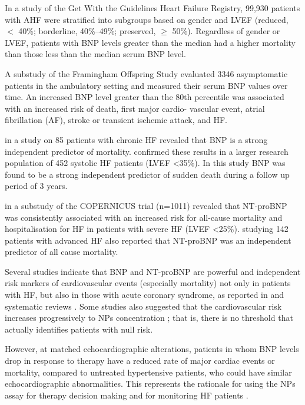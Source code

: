 \documentclass[14pt,a4paper,onecolumn]{extarticle}
\begin{document}
In a study of the Get With the Guidelines Heart Failure Registry, 99,930 patients with AHF were stratified into subgroups based on gender and LVEF (reduced, $<$ 40\%; borderline, 40\%–49\%; preserved, $\geq$ 50\%). Regardless of gender or LVEF, patients with BNP levels greater than the median had a higher mortality than those less than the median serum BNP level. \citep{Hsich2013}  %

A substudy of the Framingham Offspring Study evaluated 3346 asymptomatic patients in the ambulatory setting and measured their serum BNP values over time. An increased BNP level greater than the 80th percentile was associated with an increased risk of death, first major cardio- vascular event, atrial fibrillation (AF), stroke or transient ischemic attack, and HF. \citep{Wang2004c} %

\citep{Tsutamoto1997} in a study on 85 patients with chronic HF revealed that BNP is a strong independent predictor of mortality.  \citep{Berger2002} confirmed these results in a larger research population of 452 systolic HF patients (LVEF <35\%). In this study BNP was found to be a strong independent predictor of sudden death during a follow up period of 3 years.

\citep{Hartmann2004} in a substudy of the COPERNICUS trial (n=1011) revealed that NT-proBNP was consistently associated with an increased risk for all-cause mortality and hospitalisation for HF in patients with severe HF (LVEF <25\%). \citep{Gardner2003b} studying 142 patients with advanced HF also reported that NT-proBNP was an independent predictor of all cause mortality.

Several studies indicate that BNP and NT-proBNP are powerful and independent risk markers of cardiovascular events (especially mortality) not only in patients with HF, but also in those with acute coronary syndrome, as reported in  and systematic reviews \citep{bib35} \citep{bib376} \citep{bib377} \citep{bib378}. Some studies also suggested that the cardiovascular risk increases progressively to NPs concentration \citep{bib377} \citep{bib378} \citep{bib3194}; that is, there is no threshold that actually identifies patients with null risk.

However, at matched echocardiographic alterations, patients in whom BNP levels drop in response to therapy have a reduced rate of major cardiac events or mortality, compared to untreated hypertensive patients, who could have similar echocardiographic abnormalities. This represents the rationale for using the NPs assay for therapy decision making and for monitoring HF patients \citep{bib35} \citep{bib363} \citep{bib364}.
\end{document}

